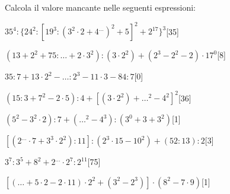 Calcola il valore mancante nelle seguenti espressioni:

\begin{esercizio} \label{ese:1.17}
$35^4:\{24^2:[19^3:(3^2\cdot2+4^{\dots})^2+5]^2+2^{17}\}^3$\hfill[35]
\end{esercizio}
\begin{esercizio} \label{ese:1.17}
$(13+2^2+75:{\dots}+2\cdot3^2):(3\cdot2^2)+(2^3-2^2-2)\cdot17^0$\hfill[8]
\end{esercizio}
\begin{esercizio} \label{ese:1.17}
$35:7+13\cdot2^2-{\dots}:2^3-11\cdot3-84:7$\hfill[0]
\end{esercizio}
\begin{esercizio} \label{ese:1.17}
$(15:3+7^2-2\cdot5):4+[(3\cdot2^2)+{\dots}^2-4^2]^2$\hfill[36]
\end{esercizio}
\begin{esercizio} \label{ese:1.17}
$(5^2-3^2\cdot2):7+({\dots}^2-4^3):(3^0+3+3^2)$\hfill[1]
\end{esercizio}
\begin{esercizio} \label{ese:1.17}
$[(2^{\dots}\cdot7+3^3\cdot2^2):11]:(2^3\cdot15-10^2)+(52:13):2$\hfill[3]
\end{esercizio}
\begin{esercizio} \label{ese:1.17}
$3^7:3^5+8^2+2^{\dots}\cdot2^7:2^{11}$\hfill[75]
\end{esercizio}
\begin{esercizio} \label{ese:1.17}
$[({\dots}+5\cdot2-2\cdot11)\cdot2^2+(3^2-2^3)]\cdot(8^2-7\cdot9)$\hfill[1]
\end{esercizio}
